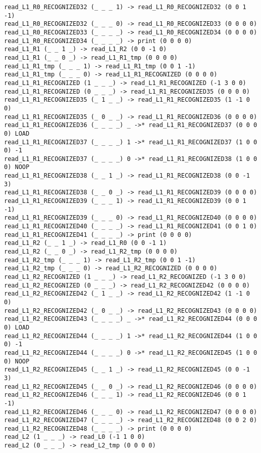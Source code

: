 \documentclass[english,shortabstract,mgr]{iithesis}
\begin{document}
\begin{verbatim}
read_L1_R0_RECOGNIZED32 (_ _ _ 1) -> read_L1_R0_RECOGNIZED32 (0 0 1 -1)
read_L1_R0_RECOGNIZED32 (_ _ _ 0) -> read_L1_R0_RECOGNIZED33 (0 0 0 0)
read_L1_R0_RECOGNIZED33 (_ _ _ _) -> read_L1_R0_RECOGNIZED34 (0 0 0 0)
read_L1_R0_RECOGNIZED34 (_ _ _ _) -> print (0 0 0 0)
read_L1_R1 (_ _ 1 _) -> read_L1_R2 (0 0 -1 0)
read_L1_R1 (_ _ 0 _) -> read_L1_R1_tmp (0 0 0 0)
read_L1_R1_tmp (_ _ _ 1) -> read_L1_R1_tmp (0 0 1 -1)
read_L1_R1_tmp (_ _ _ 0) -> read_L1_R1_RECOGNIZED (0 0 0 0)
read_L1_R1_RECOGNIZED (1 _ _ _) -> read_L1_R1_RECOGNIZED (-1 3 0 0)
read_L1_R1_RECOGNIZED (0 _ _ _) -> read_L1_R1_RECOGNIZED35 (0 0 0 0)
read_L1_R1_RECOGNIZED35 (_ 1 _ _) -> read_L1_R1_RECOGNIZED35 (1 -1 0 0)
read_L1_R1_RECOGNIZED35 (_ 0 _ _) -> read_L1_R1_RECOGNIZED36 (0 0 0 0)
read_L1_R1_RECOGNIZED36 (_ _ _ _) _ ->* read_L1_R1_RECOGNIZED37 (0 0 0 0) LOAD
read_L1_R1_RECOGNIZED37 (_ _ _ _) 1 ->* read_L1_R1_RECOGNIZED37 (1 0 0 0) -1
read_L1_R1_RECOGNIZED37 (_ _ _ _) 0 ->* read_L1_R1_RECOGNIZED38 (1 0 0 0) NOOP
read_L1_R1_RECOGNIZED38 (_ _ 1 _) -> read_L1_R1_RECOGNIZED38 (0 0 -1 3)
read_L1_R1_RECOGNIZED38 (_ _ 0 _) -> read_L1_R1_RECOGNIZED39 (0 0 0 0)
read_L1_R1_RECOGNIZED39 (_ _ _ 1) -> read_L1_R1_RECOGNIZED39 (0 0 1 -1)
read_L1_R1_RECOGNIZED39 (_ _ _ 0) -> read_L1_R1_RECOGNIZED40 (0 0 0 0)
read_L1_R1_RECOGNIZED40 (_ _ _ _) -> read_L1_R1_RECOGNIZED41 (0 0 1 0)
read_L1_R1_RECOGNIZED41 (_ _ _ _) -> print (0 0 0 0)
read_L1_R2 (_ _ 1 _) -> read_L1_R0 (0 0 -1 1)
read_L1_R2 (_ _ 0 _) -> read_L1_R2_tmp (0 0 0 0)
read_L1_R2_tmp (_ _ _ 1) -> read_L1_R2_tmp (0 0 1 -1)
read_L1_R2_tmp (_ _ _ 0) -> read_L1_R2_RECOGNIZED (0 0 0 0)
read_L1_R2_RECOGNIZED (1 _ _ _) -> read_L1_R2_RECOGNIZED (-1 3 0 0)
read_L1_R2_RECOGNIZED (0 _ _ _) -> read_L1_R2_RECOGNIZED42 (0 0 0 0)
read_L1_R2_RECOGNIZED42 (_ 1 _ _) -> read_L1_R2_RECOGNIZED42 (1 -1 0 0)
read_L1_R2_RECOGNIZED42 (_ 0 _ _) -> read_L1_R2_RECOGNIZED43 (0 0 0 0)
read_L1_R2_RECOGNIZED43 (_ _ _ _) _ ->* read_L1_R2_RECOGNIZED44 (0 0 0 0) LOAD
read_L1_R2_RECOGNIZED44 (_ _ _ _) 1 ->* read_L1_R2_RECOGNIZED44 (1 0 0 0) -1
read_L1_R2_RECOGNIZED44 (_ _ _ _) 0 ->* read_L1_R2_RECOGNIZED45 (1 0 0 0) NOOP
read_L1_R2_RECOGNIZED45 (_ _ 1 _) -> read_L1_R2_RECOGNIZED45 (0 0 -1 3)
read_L1_R2_RECOGNIZED45 (_ _ 0 _) -> read_L1_R2_RECOGNIZED46 (0 0 0 0)
read_L1_R2_RECOGNIZED46 (_ _ _ 1) -> read_L1_R2_RECOGNIZED46 (0 0 1 -1)
read_L1_R2_RECOGNIZED46 (_ _ _ 0) -> read_L1_R2_RECOGNIZED47 (0 0 0 0)
read_L1_R2_RECOGNIZED47 (_ _ _ _) -> read_L1_R2_RECOGNIZED48 (0 0 2 0)
read_L1_R2_RECOGNIZED48 (_ _ _ _) -> print (0 0 0 0)
read_L2 (1 _ _ _) -> read_L0 (-1 1 0 0)
read_L2 (0 _ _ _) -> read_L2_tmp (0 0 0 0)

\end{verbatim}
\end{document}
